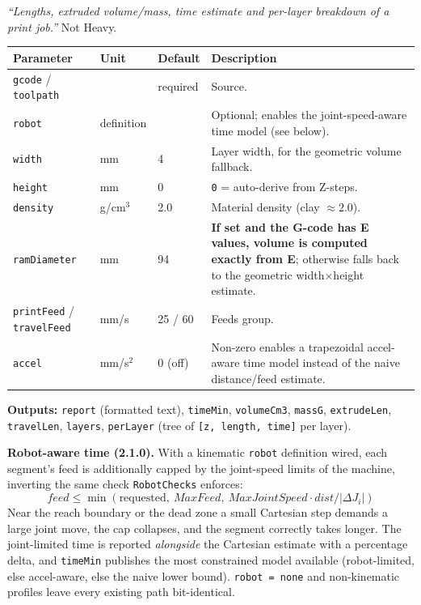 \documentclass[11pt]{article}
\newcommand{\param}[1]{\texttt{#1}}
\begin{document}
\emph{``Lengths, extruded volume/mass, time estimate and per-layer
breakdown of a print job.''} Not Heavy.

\begin{longtable}{@{}p{3.2cm}p{2.0cm}p{2.0cm}p{6.4cm}@{}}
\toprule
\textbf{Parameter} & \textbf{Unit} & \textbf{Default} & \textbf{Description} \\
\midrule
\endhead
\param{gcode} / \param{toolpath} & & required & Source. \\
\param{robot} & definition & & Optional; enables the joint-speed-aware time model (see below). \\
\param{width} & mm & 4 & Layer width, for the geometric volume fallback. \\
\param{height} & mm & 0 & \param{0} = auto-derive from Z-steps. \\
\param{density} & g/cm$^3$ & 2.0 & Material density (clay $\approx 2.0$). \\
\param{ramDiameter} & mm & 94 & \textbf{If set and the G-code has E values, volume is computed exactly from E}; otherwise falls back to the geometric width$\times$height estimate. \\
\param{printFeed} / \param{travelFeed} & mm/s & 25 / 60 & Feeds group. \\
\param{accel} & mm/s$^2$ & 0 (off) & Non-zero enables a trapezoidal accel-aware time model instead of the naive distance/feed estimate. \\
\bottomrule
\end{longtable}

\textbf{Outputs:} \param{report} (formatted text), \param{timeMin},
\param{volumeCm3}, \param{massG}, \param{extrudeLen}, \param{travelLen},
\param{layers}, \param{perLayer} (tree of \texttt{[z, length, time]} per
layer).

\textbf{Robot-aware time (2.1.0).} With a kinematic \param{robot}
definition wired, each segment's feed is additionally capped by the joint-speed limits of the machine, inverting the same check
\param{RobotChecks} enforces:
\[
feed \le \min(\text{requested},\ MaxFeed,\ MaxJointSpeed \cdot dist/|\Delta J_i|)
\]
Near the reach boundary or the dead zone a small Cartesian step demands
a large joint move, the cap collapses, and the segment correctly takes
longer. The joint-limited time is reported \emph{alongside} the
Cartesian estimate with a percentage delta, and \param{timeMin}
publishes the most constrained model available (robot-limited, else
accel-aware, else the naive lower bound). \param{robot = none} and
non-kinematic profiles leave every existing path bit-identical.
\end{document}
